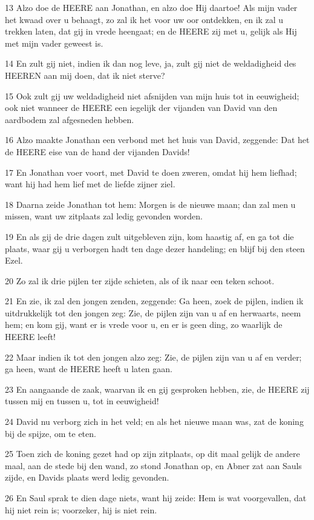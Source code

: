 \par 13 Alzo doe de HEERE aan Jonathan, en alzo doe Hij daartoe! Als mijn vader het kwaad over u behaagt, zo zal ik het voor uw oor ontdekken, en ik zal u trekken laten, dat gij in vrede heengaat; en de HEERE zij met u, gelijk als Hij met mijn vader geweest is.
\par 14 En zult gij niet, indien ik dan nog leve, ja, zult gij niet de weldadigheid des HEEREN aan mij doen, dat ik niet sterve?
\par 15 Ook zult gij uw weldadigheid niet afsnijden van mijn huis tot in eeuwigheid; ook niet wanneer de HEERE een iegelijk der vijanden van David van den aardbodem zal afgesneden hebben.
\par 16 Alzo maakte Jonathan een verbond met het huis van David, zeggende: Dat het de HEERE eise van de hand der vijanden Davids!
\par 17 En Jonathan voer voort, met David te doen zweren, omdat hij hem liefhad; want hij had hem lief met de liefde zijner ziel.
\par 18 Daarna zeide Jonathan tot hem: Morgen is de nieuwe maan; dan zal men u missen, want uw zitplaats zal ledig gevonden worden.
\par 19 En als gij de drie dagen zult uitgebleven zijn, kom haastig af, en ga tot die plaats, waar gij u verborgen hadt ten dage dezer handeling; en blijf bij den steen Ezel.
\par 20 Zo zal ik drie pijlen ter zijde schieten, als of ik naar een teken schoot.
\par 21 En zie, ik zal den jongen zenden, zeggende: Ga heen, zoek de pijlen, indien ik uitdrukkelijk tot den jongen zeg: Zie, de pijlen zijn van u af en herwaarts, neem hem; en kom gij, want er is vrede voor u, en er is geen ding, zo waarlijk de HEERE leeft!
\par 22 Maar indien ik tot den jongen alzo zeg: Zie, de pijlen zijn van u af en verder; ga heen, want de HEERE heeft u laten gaan.
\par 23 En aangaande de zaak, waarvan ik en gij gesproken hebben, zie, de HEERE zij tussen mij en tussen u, tot in eeuwigheid!
\par 24 David nu verborg zich in het veld; en als het nieuwe maan was, zat de koning bij de spijze, om te eten.
\par 25 Toen zich de koning gezet had op zijn zitplaats, op dit maal gelijk de andere maal, aan de stede bij den wand, zo stond Jonathan op, en Abner zat aan Sauls zijde, en Davids plaats werd ledig gevonden.
\par 26 En Saul sprak te dien dage niets, want hij zeide: Hem is wat voorgevallen, dat hij niet rein is; voorzeker, hij is niet rein.
